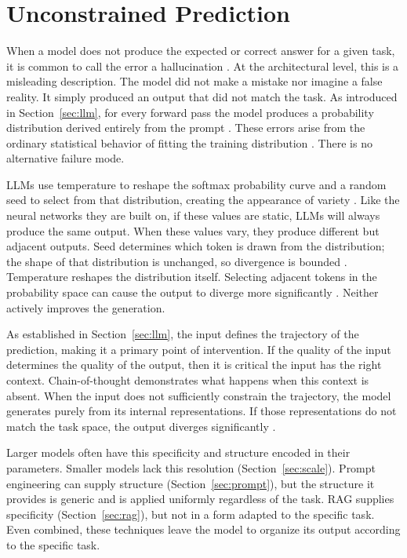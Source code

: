 \documentclass[master]{thesis}
\newcommand{\sref}[1]{Section~\ref{#1}}  %
\begin{document}
\section{Unconstrained Prediction}
\label{sec:unconstrained}


When a model does not produce the expected or correct answer for a given task, it is common to call the error a hallucination \cite{ji2023hallucination, hallucination_unified2024}. At the architectural level, this is a misleading description. The model did not make a mistake nor imagine a false reality. It simply produced an output that did not match the task. As introduced in \sref{sec:llm}, for every forward pass the model produces a probability distribution derived entirely from the prompt \cite{brown2020gpt3, llmreasoning_stochastic2024}. These errors arise from the ordinary statistical behavior of fitting the training distribution \cite{whyllmshallucinate2024}. There is no alternative failure mode.

LLMs use temperature to reshape the softmax probability curve and a random seed to select from that distribution, creating the appearance of variety \cite{temperature_impact2025}. Like the neural networks they are built on, if these values are static, LLMs will always produce the same output. When these values vary, they produce different but adjacent outputs. Seed determines which token is drawn from the distribution; the shape of that distribution is unchanged, so divergence is bounded \cite{seed_temperature_stability2025}. Temperature reshapes the distribution itself. Selecting adjacent tokens in the probability space can cause the output to diverge more significantly \cite{temperature_impact2025}. Neither actively improves the generation.

As established in \sref{sec:llm}, the input defines the trajectory of the prediction, making it a primary point of intervention. If the quality of the input determines the quality of the output, then it is critical the input has the right context. Chain-of-thought demonstrates what happens when this context is absent. When the input does not sufficiently constrain the trajectory, the model generates purely from its internal representations. If those representations do not match the task space, the output diverges significantly \cite{cot_degradation_slm2025, smallmodel_learnability2025}.

Larger models often have this specificity and structure encoded in their parameters. Smaller models lack this resolution (\sref{sec:scale}). Prompt engineering can supply structure (\sref{sec:prompt}), but the structure it provides is generic and is applied uniformly regardless of the task. RAG supplies specificity (\sref{sec:rag}), but not in a form adapted to the specific task. Even combined, these techniques leave the model to organize its output according to the specific task.
\end{document}
